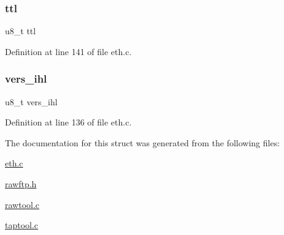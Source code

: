 \subsubsection{\texorpdfstring{ttl}{ttl}}
{\footnotesize\ttfamily u8\+\_\+t ttl}



Definition at line 141 of file eth.\+c.

\hypertarget{struct__ip__hdr_a1307abcf8fe0d3514707b3b342a156a2}{}\label{struct__ip__hdr_a1307abcf8fe0d3514707b3b342a156a2} 
\subsubsection{\texorpdfstring{vers\+\_\+ihl}{vers\_ihl}}
{\footnotesize\ttfamily u8\+\_\+t vers\+\_\+ihl}



Definition at line 136 of file eth.\+c.



The documentation for this struct was generated from the following files\+:\begin{DoxyCompactItemize}
\item 
\hyperlink{eth_8c}{eth.\+c}\item 
\hyperlink{rawftp_8h}{rawftp.\+h}\item 
\hyperlink{rawtool_8c}{rawtool.\+c}\item 
\hyperlink{taptool_8c}{taptool.\+c}\end{DoxyCompactItemize}
